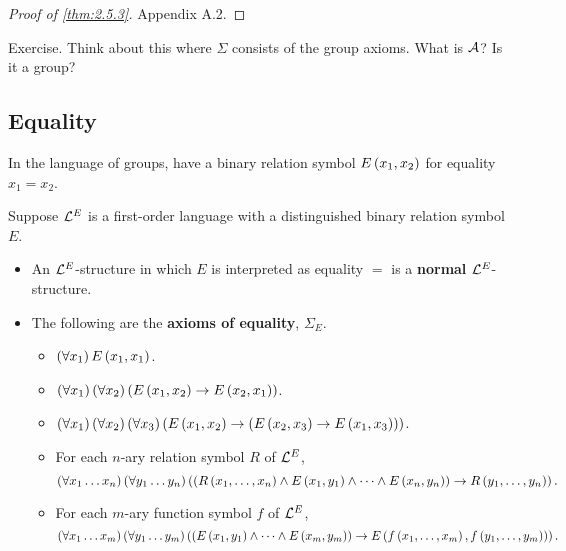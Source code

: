 \begin{proof}[Proof of \ref{thm:2.5.3}]
Appendix A.2.
\end{proof}

\begin{example*}
Exercise. Think about this where $ \Sigma $ consists of the group axioms. What is $ \AA $? Is it a group?
\end{example*}


\subsection{Equality}

\begin{example*}
In the language of groups, have a binary relation symbol $ E\rb{x_1, x_2} $ for equality $ x_1 = x_2 $.
\end{example*}

\begin{definition}
Suppose $ \LL^E $ is a first-order language with a distinguished binary relation symbol $ E $.
\begin{itemize}
\item An $ \LL^E $-structure in which $ E $ is interpreted as equality $ = $ is a \textbf{normal} $ \LL^E $-structure.
\item The following are the \textbf{axioms of equality}, $ \Sigma_E $.
\begin{itemize}
\item $ \fab{x_1}E\rb{x_1, x_1} $.
\item $ \fab{x_1}\fab{x_2}\impb{E\rb{x_1, x_2}}{E\rb{x_2, x_1}} $.
\item $ \fab{x_1}\fab{x_2}\fab{x_3}\impb{E\rb{x_1, x_2}}{\impb{E\rb{x_2, x_3}}{E\rb{x_1, x_3}}} $.
\item For each $ n $-ary relation symbol $ R $ of $ \LL^E $,
$$ \fab{x_1 \dots x_n}\fab{y_1 \dots y_n}\impb{\rb{R\rb{x_1, \dots, x_n} \land E\rb{x_1, y_1} \land \dots \land E\rb{x_n, y_n}}}{R\rb{y_1, \dots, y_n}}. $$
\item For each $ m $-ary function symbol $ f $ of $ \LL^E $,
$$ \fab{x_1 \dots x_m}\fab{y_1 \dots y_m}\impb{\rb{E\rb{x_1, y_1} \land \dots \land E\rb{x_m, y_m}}}{E\rb{f\rb{x_1, \dots, x_m}, f\rb{y_1, \dots, y_m}}}. $$
\end{itemize}
\end{itemize}
\end{definition}

\pagebreak

